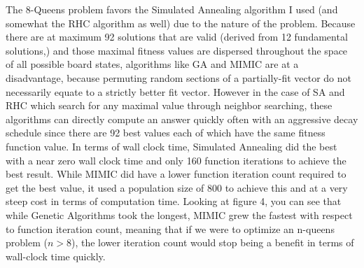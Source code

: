 \documentclass[11pt]{article}
\begin{document}
    The 8-Queens problem favors the Simulated Annealing algorithm I used (and somewhat the RHC algorithm as well) due to the nature of the problem.
    Because there are at maximum 92 solutions that are valid (derived from 12 fundamental solutions,)\cite{wikipedia_2020} and
    those maximal fitness values are dispersed throughout the space of all possible board states, algorithms like GA and
    MIMIC are at a disadvantage, because permuting random sections of a partially-fit vector do not necessarily equate to a
    strictly better fit vector.
    However in the case of SA and RHC which search for any maximal value through neighbor searching, these algorithms can directly
    compute an answer quickly often with an aggressive decay schedule since there are 92 best values each of which have the
    same fitness function value.
    In terms of wall clock time, Simulated Annealing did the best with a near zero wall clock time and only 160 function iterations to
    achieve the best result.
    While MIMIC did have a lower function iteration count required to get the best value, it used a population size of 800
    to achieve this and at a very steep cost in terms of computation time.
    Looking at figure 4, you can see that while Genetic Algorithms took the longest, MIMIC grew the fastest with respect to function
    iteration count, meaning that if we were to optimize an n-queens problem ($n > 8$), the lower iteration count would stop
    being a benefit in terms of wall-clock time quickly.
\end{document}
